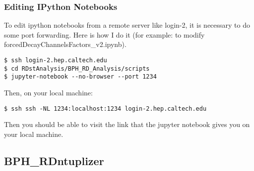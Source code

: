 \documentclass[12pt]{article}
\begin{document}
\subsubsection{Editing IPython Notebooks}
To edit ipython notebooks from a remote server like login-2, it is necessary to do some port forwarding. Here is how I do it (for example: to modify forcedDecayChannelsFactors\_v2.ipynb).
\begin{mdframed}[backgroundcolor=light-gray, roundcorner=10pt,leftmargin=1, rightmargin=1, innerleftmargin=15, innertopmargin=15,innerbottommargin=15, outerlinewidth=1, linecolor=light-gray,roundcorner=20pt]
\begin{lstlisting}
$ ssh login-2.hep.caltech.edu
$ cd RDstAnalysis/BPH_RD_Analysis/scripts
$ jupyter-notebook --no-browser --port 1234
\end{lstlisting}
\end{mdframed}
Then, on your local machine:
\begin{mdframed}[backgroundcolor=light-gray, roundcorner=10pt,leftmargin=1, rightmargin=1, innerleftmargin=15, innertopmargin=15,innerbottommargin=15, outerlinewidth=1, linecolor=light-gray,roundcorner=20pt]
\begin{lstlisting}
$ ssh ssh -NL 1234:localhost:1234 login-2.hep.caltech.edu
\end{lstlisting}
\end{mdframed}
Then you should be able to visit the link that the jupyter notebook gives you
on your local machine.
\subsection{BPH_RDntuplizer}
\end{document}
